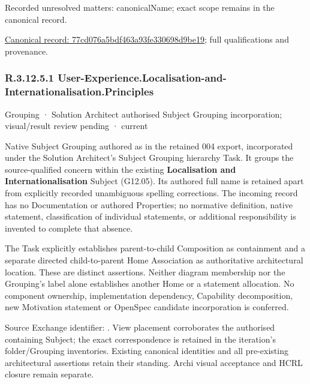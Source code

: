{\small Recorded unresolved matters: canonicalName; exact scope remains in the canonical record.}\par
{\footnotesize \href{../../../../continuum/grouping/77cd076a5bdf463a93fe330698d9be19.md}{Canonical record: 77cd076a5bdf463a93fe330698d9be19}; full qualifications and provenance.}\par
\subsubsection*{R.3.12.5.1 User-Experience.Localisation-and-Internationalisation.Principles}
\label{navigation:R.3.12.5.1}

\label{element:f71f084dd9154318b86ca22f0fe8c36d}
{\small Grouping · Solution Architect authorised Subject Grouping incorporation; visual/result review pending · current}\par

Native Subject Grouping authored as \texttt{} in the retained 004 export,
incorporated under the Solution Architect's Subject Grouping hierarchy Task.
It groups the source-qualified \texttt{} concern within
the existing \textbf{Localisation and Internationalisation} Subject (G12.05). Its authored full name
is retained apart from explicitly recorded unambiguous spelling corrections.
The incoming record has no Documentation or authored Properties; no normative
definition, native statement, classification of individual statements, or
additional responsibility is invented to complete that absence.



The Task explicitly establishes parent-to-child Composition as containment and
a separate directed child-to-parent Home Association as authoritative architectural
location. These are distinct assertions. Neither diagram membership nor the
Grouping's label alone establishes another Home or a statement allocation.
No component ownership, implementation dependency, Capability decomposition,
new Motivation statement or OpenSpec candidate incorporation is conferred.



Source Exchange identifier: \texttt{}. View placement corroborates
the authorised containing Subject; the exact correspondence is retained in the
iteration's folder/Grouping inventories. Existing canonical identities and all
pre-existing architectural assertions retain their standing. Archi visual
acceptance and HCRL closure remain separate.


